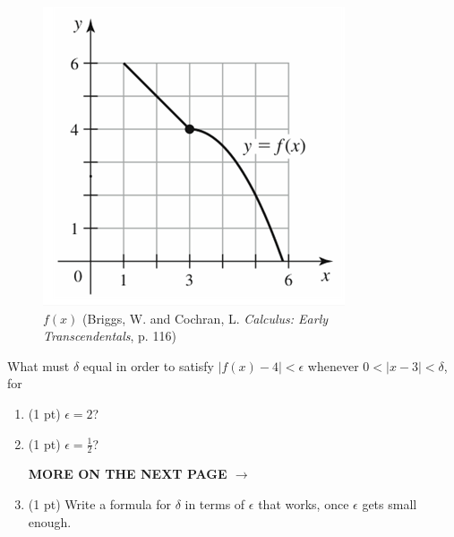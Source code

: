 \documentclass[11pt,letterpaper]{article}
\begin{document}
\begin{enumerate}
\vspace{-1pc}  
\begin{figure}[h]
\begin{center}
\includegraphics[scale=0.6]{Q3pic.png}
\caption{$f(x)$ (Briggs, W. and Cochran, L. \emph{Calculus: Early Transcendentals}, p. 116)}
\end{center}
\end{figure}

\vspace{-0.5pc}
What must $\delta$ equal in order to satisfy $|f(x)-4|<\epsilon$ whenever $0<|x-3|<\delta$, for 
\begin{enumerate}
\item (1 pt) $\epsilon=2$?

\vspace{0.5pc}
\vspace{1.3pc}

\vspace{0.5pc}
\item (1 pt) $\epsilon=\frac{1}{2}$?

\vspace{0.5pc}
\vspace{1.3pc}

\hfill {\bf\Large MORE ON THE NEXT PAGE $\to$}

\vspace{0.5pc}
\item (1 pt) Write a formula for $\delta$ in terms of $\epsilon$ that works, once $\epsilon$ gets small enough.

\vspace{0.5pc}
\vspace{1.3pc}


\end{enumerate}
\end{enumerate}
\end{document}
